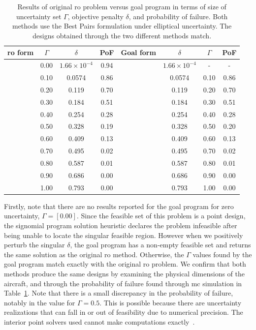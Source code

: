 \begin{table}
\begin{center}
\caption{\label{tab:deltaVsGamma} Results of original \gls{ro} problem versus goal program in terms
of size of uncertainty set $\Gamma$, objective penalty $\delta$, and probability of failure. Both methods
use the Best Pairs formulation under elliptical uncertainty. The designs obtained through
the two different methods match.}
\begin{tabular}{c c c c c c c c}
\hline
 \gls{ro} form & $\Gamma$ & $\delta$ & PoF & Goal form & $\delta$ & $\Gamma$ & PoF\\
\hline
& 0.00 & $1.66 \times 10^{-4}$ & 0.94 & & $1.66 \times 10^{-4}$ & - & - \\
& 0.10 & 0.0574 & 0.86 & & 0.0574 & 0.10 & 0.86 \\
& 0.20 & 0.119 & 0.70 & & 0.119 & 0.20 & 0.70 \\
& 0.30 & 0.184 & 0.51 & & 0.184 & 0.30 & 0.51 \\
& 0.40 & 0.254 & 0.28 & & 0.254 & 0.40 & 0.28 \\
& 0.50 & 0.328 & 0.19 & & 0.328 & 0.50 & 0.20 \\
& 0.60 & 0.409 & 0.13 & & 0.409 & 0.60 & 0.13 \\
& 0.70 & 0.495 & 0.02 & & 0.495 & 0.70 & 0.02 \\
& 0.80 & 0.587 & 0.01 & & 0.587 & 0.80 & 0.01 \\
& 0.90 & 0.686 & 0.00 & & 0.686 & 0.90 & 0.00 \\
& 1.00 & 0.793 & 0.00 & & 0.793 & 1.00 & 0.00 \\
\end{tabular}
\end{center}
\end{table}

Firstly, note that there are no results reported for the goal program
for zero uncertainty, $\Gamma = [0.00]$.
Since the feasible set of this problem is a point design, the signomial program
solution heuristic declares the problem infeasible after being
unable to locate the singular feasible region. However when we positively perturb
the singular $\delta$, the goal program has a non-empty feasible set and
returns the same solution as the original \gls{ro} method.
Otherwise, the $\Gamma$ values found by the goal program match exactly
with the original \gls{ro} problem. We confirm that both methods produce
the same designs by examining the physical dimensions of the aircraft, and through the probability
of failure found through \gls{mc} simulation in Table~\ref{tab:deltaVsGamma}.
Note that there is a small discrepancy
in the probability of failure, notably in the value for $\Gamma = 0.5$. This is
possible because there are uncertainty realizations that can fall
in or out of feasibility due to numerical precision. The interior point solvers
used cannot make computations exactly~\cite{Nesterov1994}.

